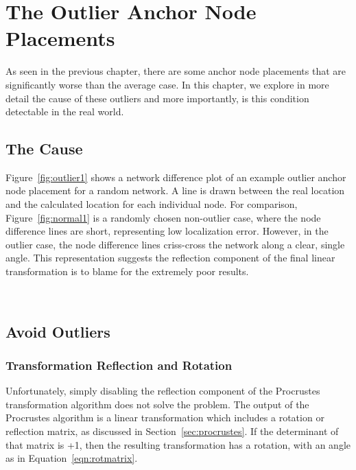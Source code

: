 \chapter{The Outlier Anchor Node Placements}
\label{chap:outliers}
As seen in the previous chapter, there are some anchor node placements that are significantly worse than the average case.   In this chapter, we explore in more detail the cause of these outliers and more importantly, is this condition detectable in the real world.

\section{The Cause}
Figure~\ref{fig:outlier1} shows a network difference plot of an example outlier anchor node placement for a random network. A line is drawn between the real location and the calculated location for each individual node.  For comparison, Figure~\ref{fig:normal1} is a randomly chosen non-outlier case, where the node difference lines are short, representing low localization error.  However, in the outlier case, the node difference lines criss-cross the network along a clear, single angle.  This representation suggests the reflection component of the final linear transformation is to blame for the extremely poor results.

\begin{figure}
  \centering
\\
	\label{fig:outliernetworkdiff}
	\caption{}
\end{figure}

\section{Avoid Outliers}
\subsection{Transformation Reflection and Rotation}
\label{sec:reflection}
Unfortunately, simply disabling the reflection component of the Procrustes transformation algorithm does not solve the problem.  The output of the Procrustes algorithm is a linear transformation which includes a rotation or reflection matrix, as discussed in Section~\ref{sec:procrustes}.  If the determinant of that matrix is +1, then the resulting transformation has a rotation, with an angle as in Equation~\ref{eqn:rotmatrix}.  

